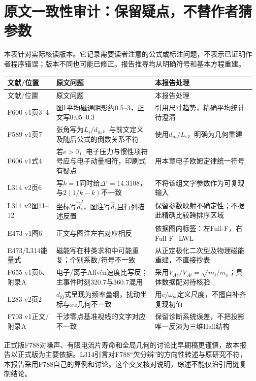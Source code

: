 \documentclass[UTF8,a4paper,11pt,openany,fontset=fandol]{ctexbook}
\begin{document}
\section{原文一致性审计：保留疑点，不替作者猜参数}
\label{sec:remaining-audit}
本表针对实际核读版本。它记录需要读者注意的公式或标注问题，不表示已证明作者程序错误；版本不同也可能已修正。报告推导均从明确符号和基本方程重建。
\begin{longtable}{P{24mm}P{76mm}P{49mm}}
\toprule 文献/位置 & 原文问题 & 本报告处理\\\midrule\endfirsthead
\toprule 文献/位置 & 原文问题 & 本报告处理\\\midrule\endhead
F600 v1页3--4 & 图1平均磁通阴影约0.5--3，正文写0.05--0.3 & 引用尺寸趋势，精确平均统计待澄清\\
F589 v1页7 & 张角写为$L_i/d_m$，与前文定义及随后公式的倒数关系不符 & 使用$d_m/L_i$，明确为几何重建\\
F606 v1式4 & 若$e>0$，电子压力与惯性项符号应与电子动量相符，印刷式有疑点 & 用本章电子欧姆定律统一符号\\
L314 v2页6 & 写$k=1$同时给$\Delta'=14.3108$，与$2(1/k-k)$不一致 & 不将该组文字参数作为可复现输入\\
L314 v2图11--12 & 坐标写$\hat d_e^2$，图注写$\hat d_e$且行列描述反置 & 保留参数映射不确定性；不据此精确比较跨排序区域\\
E473 v1图6 & 正文与图注左右对应相反 & 依据图内标签：左Full-F，右Full-F+LWL\\
E473/L314能量式 & 磁能写在种类求和中可能重复；个别系数/符号不一致 & 从正定极化二次型及物理磁能重建，不直接抄表\\
F655 v1页6、附录A & 电子/离子Alfvén速度比写反；主事件时刻320.7与360.7混用 & 采用$V_{Ae}/V_{Ai}=\sqrt{m_i/m_e}$；具体数据配对待核验\\
L283 v2页2 & $d_{i0}$式呈现为频率量纲，扰动坐标与$xz$几何不一致 & 用$c/\omega_{pi}$定义尺度，不擅自补齐复现初值\\
F703 v1正文/附录A & 干涉零点基准视线的文字对应不一致 & 保留诊断系统误差，不把投影唯一反演为三维Hall结构\\
\bottomrule
\end{longtable}

正式版F788对噪声、有限电流片寿命和全局几何的讨论比早期稿更谨慎，故本报告以正式版为主要依据。L314引言对F788“欠分辨”的方向性转述与原研究不符，本报告采用F788自己的算例和讨论。这个交叉核对说明，综述不能仅沿引用链复制结论。
\end{document}
